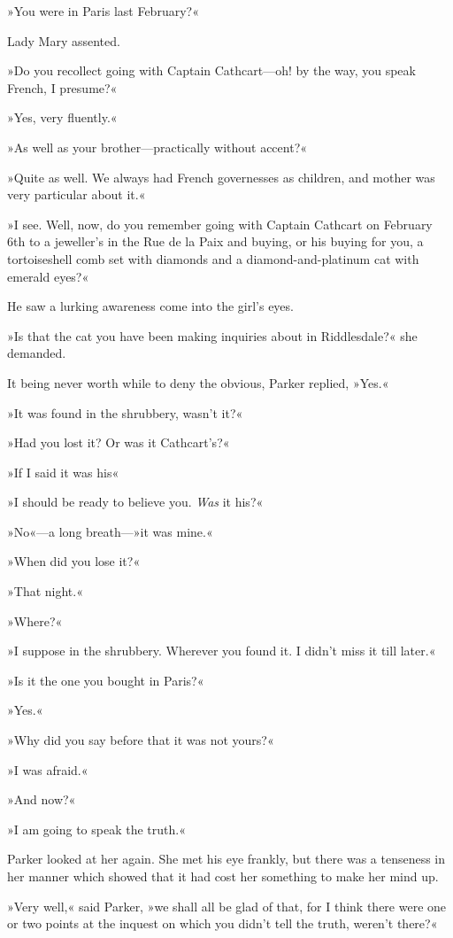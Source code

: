 »You were in Paris last February?«

Lady Mary assented.

»Do you recollect going with Captain Cathcart—oh! by the way, you speak French, I presume?«

»Yes, very fluently.«

»As well as your brother—practically without accent?«

»Quite as well. We always had French governesses as children, and mother was very particular about it.«

»I see. Well, now, do you remember going with Captain Cathcart on February 6th to a jeweller's in the Rue de la Paix and buying, or his buying for you, a tortoiseshell comb set with diamonds and a diamond-and-platinum cat with emerald eyes?«

He saw a lurking awareness come into the girl's eyes.

»Is that the cat you have been making inquiries about in Riddlesdale?« she demanded.

It being never worth while to deny the obvious, Parker replied, »Yes.«

»It was found in the shrubbery, wasn't it?«

»Had you lost it? Or was it Cathcart's?«

»If I said it was his\longdash«

»I should be ready to believe you. \textit{Was} it his?«

»No«—a long breath—»it was mine.«

»When did you lose it?«

»That night.«

»Where?«

»I suppose in the shrubbery. Wherever you found it. I didn't miss it till later.«

»Is it the one you bought in Paris?«

»Yes.«

»Why did you say before that it was not yours?«

»I was afraid.«

»And now?«

»I am going to speak the truth.«

Parker looked at her again. She met his eye frankly, but there was a tenseness in her manner which showed that it had cost her something to make her mind up.

»Very well,« said Parker, »we shall all be glad of that, for I think there were one or two points at the inquest on which you didn't tell the truth, weren't there?«

